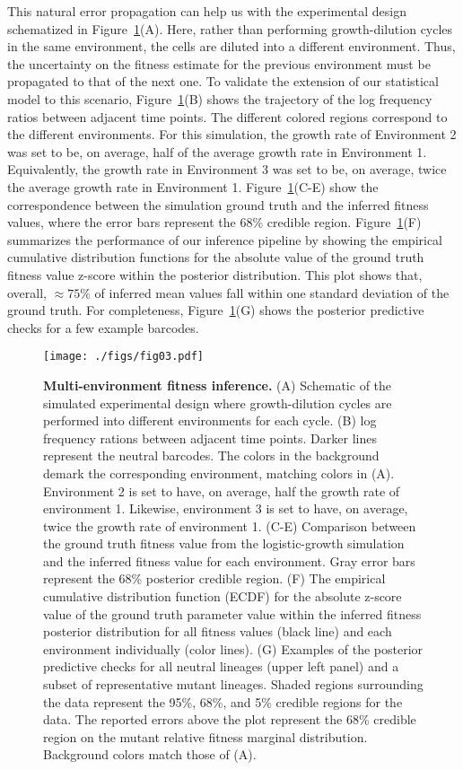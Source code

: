 \documentclass[
]{scrartcl}
\begin{document}
\begin{refsegment}
This natural error propagation can help us with the experimental design
schematized in Figure~\ref{fig-03}(A). Here, rather than performing
growth-dilution cycles in the same environment, the cells are diluted
into a different environment. Thus, the uncertainty on the fitness
estimate for the previous environment must be propagated to that of the
next one. To validate the extension of our statistical model to this
scenario, Figure~\ref{fig-03}(B) shows the trajectory of the log
frequency ratios between adjacent time points. The different colored
regions correspond to the different environments. For this simulation,
the growth rate of Environment 2 was set to be, on average, half of the
average growth rate in Environment 1. Equivalently, the growth rate in
Environment 3 was set to be, on average, twice the average growth rate
in Environment 1. Figure~\ref{fig-03}(C-E) show the correspondence
between the simulation ground truth and the inferred fitness values,
where the error bars represent the 68\% credible region.
Figure~\ref{fig-03}(F) summarizes the performance of our inference
pipeline by showing the empirical cumulative distribution functions for
the absolute value of the ground truth fitness value z-score within the
posterior distribution. This plot shows that, overall, \(\approx 75\%\)
of inferred mean values fall within one standard deviation of the ground
truth. For completeness, Figure~\ref{fig-03}(G) shows the posterior
predictive checks for a few example barcodes.

\begin{figure}

{\centering \texttt{[image: ./figs/fig03.pdf]}

}

\caption{\label{fig-03}\textbf{Multi-environment fitness inference.} (A)
Schematic of the simulated experimental design where growth-dilution
cycles are performed into different environments for each cycle. (B) log
frequency rations between adjacent time points. Darker lines represent
the neutral barcodes. The colors in the background demark the
corresponding environment, matching colors in (A). Environment 2 is set
to have, on average, half the growth rate of environment 1. Likewise,
environment 3 is set to have, on average, twice the growth rate of
environment 1. (C-E) Comparison between the ground truth fitness value
from the logistic-growth simulation and the inferred fitness value for
each environment. Gray error bars represent the 68\% posterior credible
region. (F) The empirical cumulative distribution function (ECDF) for
the absolute z-score value of the ground truth parameter value within
the inferred fitness posterior distribution for all fitness values
(black line) and each environment individually (color lines). (G)
Examples of the posterior predictive checks for all neutral lineages
(upper left panel) and a subset of representative mutant lineages.
Shaded regions surrounding the data represent the 95\%, 68\%, and 5\%
credible regions for the data. The reported errors above the plot
represent the 68\% credible region on the mutant relative fitness
marginal distribution. Background colors match those of (A).}


\end{figure}
\end{refsegment}
\end{document}
